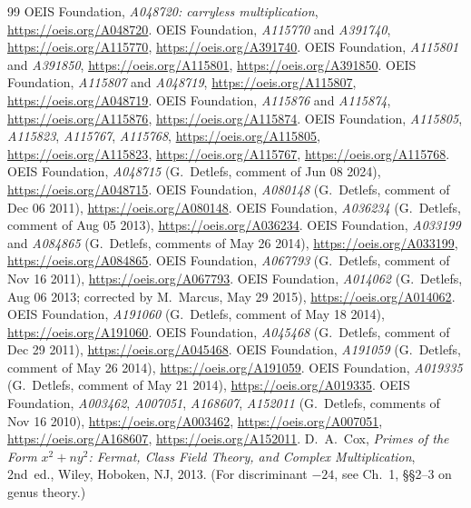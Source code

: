 \documentclass[11pt]{article}
\begin{document}
\begin{thebibliography}{99}
 OEIS Foundation, \emph{A048720: carryless
  multiplication}, \url{https://oeis.org/A048720}.
 OEIS Foundation, \emph{A115770} and \emph{A391740},
  \url{https://oeis.org/A115770}, \url{https://oeis.org/A391740}.
 OEIS Foundation, \emph{A115801} and \emph{A391850},
  \url{https://oeis.org/A115801}, \url{https://oeis.org/A391850}.
 OEIS Foundation, \emph{A115807} and \emph{A048719},
  \url{https://oeis.org/A115807}, \url{https://oeis.org/A048719}.
 OEIS Foundation, \emph{A115876} and \emph{A115874},
  \url{https://oeis.org/A115876}, \url{https://oeis.org/A115874}.
 OEIS Foundation, \emph{A115805}, \emph{A115823},
  \emph{A115767}, \emph{A115768}, \url{https://oeis.org/A115805},
  \url{https://oeis.org/A115823}, \url{https://oeis.org/A115767},
  \url{https://oeis.org/A115768}.
 OEIS Foundation, \emph{A048715} (G.~Detlefs,
  comment of Jun 08 2024), \url{https://oeis.org/A048715}.
 OEIS Foundation, \emph{A080148} (G.~Detlefs,
  comment of Dec 06 2011), \url{https://oeis.org/A080148}.
 OEIS Foundation, \emph{A036234} (G.~Detlefs,
  comment of Aug 05 2013), \url{https://oeis.org/A036234}.
 OEIS Foundation, \emph{A033199} and \emph{A084865}
  (G.~Detlefs, comments of May 26 2014),
  \url{https://oeis.org/A033199}, \url{https://oeis.org/A084865}.
 OEIS Foundation, \emph{A067793} (G.~Detlefs,
  comment of Nov 16 2011), \url{https://oeis.org/A067793}.
 OEIS Foundation, \emph{A014062} (G.~Detlefs,
  Aug 06 2013; corrected by M.~Marcus, May 29 2015),
  \url{https://oeis.org/A014062}.
 OEIS Foundation, \emph{A191060} (G.~Detlefs,
  comment of May 18 2014), \url{https://oeis.org/A191060}.
 OEIS Foundation, \emph{A045468} (G.~Detlefs,
  comment of Dec 29 2011), \url{https://oeis.org/A045468}.
 OEIS Foundation, \emph{A191059} (G.~Detlefs,
  comment of May 26 2014), \url{https://oeis.org/A191059}.
 OEIS Foundation, \emph{A019335} (G.~Detlefs,
  comment of May 21 2014), \url{https://oeis.org/A019335}.
 OEIS Foundation, \emph{A003462},
  \emph{A007051}, \emph{A168607}, \emph{A152011} (G.~Detlefs,
  comments of Nov 16 2010), \url{https://oeis.org/A003462},
  \url{https://oeis.org/A007051}, \url{https://oeis.org/A168607},
  \url{https://oeis.org/A152011}.
D.~A.~Cox, \emph{Primes of the Form $x^2 + ny^2$: Fermat, Class Field Theory, and Complex Multiplication}, 2nd~ed., Wiley, Hoboken, NJ, 2013. (For discriminant $-24$, see Ch.~1, \S\S 2--3 on genus theory.)


\end{thebibliography}
\end{document}
